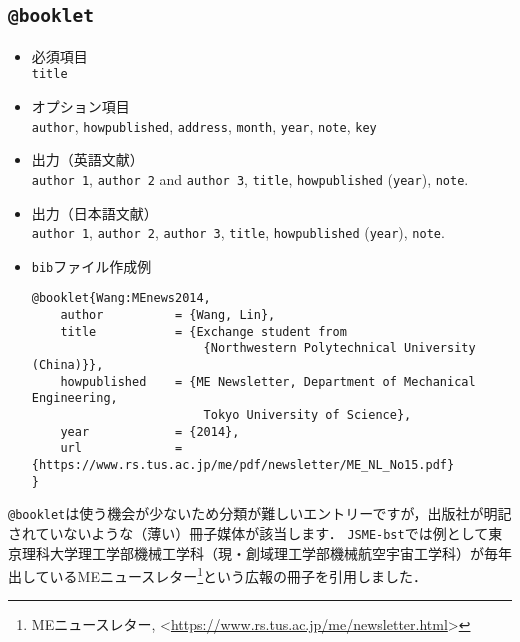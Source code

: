 \documentclass[a4paper,fleqn,uplatex,dvipdfmx]{jsarticle}
\makeatletter
\newcommand{\JSMErepos}{\texttt{JSME-bst}}
\newcommand{\ttbooklet}{\texttt{@booklet}}
\makeatother
\begin{document}
\subsection{\ttbooklet}
\label{ssec:booklet}
\begin{screen}
    \begin{itemize}
        \item 必須項目 \\
        \verb|title|
        \item オプション項目 \\
        \verb|author|, \verb|howpublished|, \verb|address|, \verb|month|, \verb|year|, \verb|note|, \verb|key|
        \item 出力（英語文献） \\
            \colorbox[gray]{0.8}{\texttt{author 1}}, \colorbox[gray]{0.8}{\texttt{author 2}} and \colorbox[gray]{0.8}{\texttt{author 3}}, \colorbox[gray]{0.8}{\texttt{title}}, \colorbox[gray]{0.8}{\texttt{howpublished}} (\colorbox[gray]{0.8}{\texttt{year}}), \colorbox[gray]{0.8}{\texttt{note}}.
        \item 出力（日本語文献） \\
            \colorbox[gray]{0.8}{\texttt{author 1}}, \colorbox[gray]{0.8}{\texttt{author 2}}, \colorbox[gray]{0.8}{\texttt{author 3}}, \colorbox[gray]{0.8}{\texttt{title}}, \colorbox[gray]{0.8}{\texttt{howpublished}} (\colorbox[gray]{0.8}{\texttt{year}}), \colorbox[gray]{0.8}{\texttt{note}}.
        \item \verb|bib|ファイル作成例 \vspace{-3mm}
\begin{verbatim}
@booklet{Wang:MEnews2014,
    author          = {Wang, Lin},
    title           = {Exchange student from 
                        {Northwestern Polytechnical University (China)}},
    howpublished    = {ME Newsletter, Department of Mechanical Engineering, 
                        Tokyo University of Science},
    year            = {2014},
    url             = {https://www.rs.tus.ac.jp/me/pdf/newsletter/ME_NL_No15.pdf}
}
\end{verbatim}
    \end{itemize}
\end{screen}

\ttbooklet は使う機会が少ないため分類が難しいエントリーですが，出版社が明記されていないような（薄い）冊子媒体が該当します．
\JSMErepos では例として東京理科大学理工学部機械工学科（現・創域理工学部機械航空宇宙工学科）が毎年出しているMEニュースレター\footnote{MEニュースレター, \textless\url{https://www.rs.tus.ac.jp/me/newsletter.html}\textgreater}という広報の冊子を引用しました．
\end{document}
